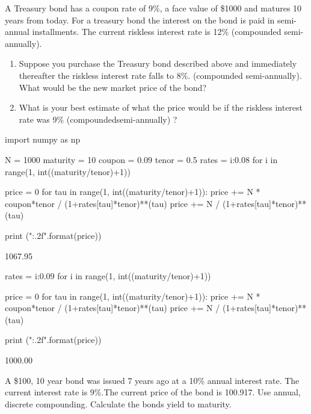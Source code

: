 \begin{question}
A Treasury bond has a coupon rate of 9\%, a face value of \$1000 and matures 10 years from today. For a treasury bond the interest on the bond is paid in semi-annual installments. The current riskless interest rate is 12\% (compounded semi-annually).
\begin{enumerate}
\item Suppose you purchase the Treasury bond described above and immediately thereafter the riskless interest rate falls to 8\%. (compounded semi-annually). What would be the new market price of the bond?
\item What is your best estimate of what the price would be if the riskless interest rate was 9\% (compoundedsemi-annually) ?
\end{enumerate}
\end{question}

\cprotEnv\begin{solution}
\begin{ipython}
import numpy as np

N = 1000
maturity = 10
coupon = 0.09
tenor = 0.5
rates = {i:0.08 for i in range(1, int((maturity/tenor)+1))}

price = 0
for tau in range(1, int((maturity/tenor)+1)):
 	price += N * coupon*tenor / (1+rates[tau]*tenor)**(tau)
price += N / (1+rates[tau]*tenor)**(tau) 

print ("{:.2f}".format(price))
\end{ipython}
\begin{ioutput}
1067.95
\end{ioutput}

\begin{ipython}
rates = {i:0.09 for i in range(1, int((maturity/tenor)+1))}
	
price = 0
for tau in range(1, int((maturity/tenor)+1)):
	price += N * coupon*tenor / (1+rates[tau]*tenor)**(tau)
price += N / (1+rates[tau]*tenor)**(tau) 
	
print ("{:.2f}".format(price))
\end{ipython}
\begin{ioutput}
1000.00
\end{ioutput}
\end{solution}

\begin{question}
A \$100, 10 year bond was issued 7 years ago at a 10\% annual interest rate. The current interest rate is 9\%.The current price of the bond is 100.917. Use annual, discrete compounding. Calculate the bonds yield to maturity.
\end{question}

